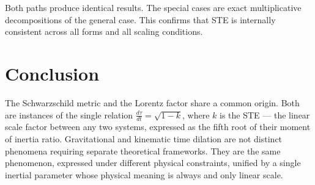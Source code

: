 \documentclass[12pt,a4paper]{article}
\begin{document}
Both paths produce identical results. The special cases are exact multiplicative decompositions of the general case. This confirms that STE is internally consistent across all forms and all scaling conditions.

\section{Conclusion}

The Schwarzschild metric and the Lorentz factor share a common origin. Both are instances of the single relation $\frac{d\tau}{dt} = \sqrt{1-k}$, where $k$ is the STE --- the linear scale factor between any two systems, expressed as the fifth root of their moment of inertia ratio. Gravitational and kinematic time dilation are not distinct phenomena requiring separate theoretical frameworks. They are the same phenomenon, expressed under different physical constraints, unified by a single inertial parameter whose physical meaning is always and only linear scale.
\end{document}
